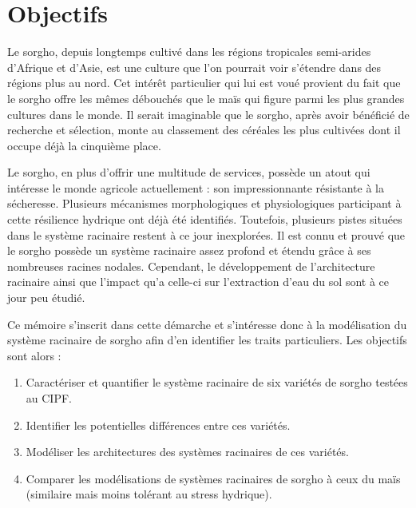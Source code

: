 \section{Objectifs}

Le sorgho, depuis longtemps cultivé dans les régions tropicales semi-arides d'Afrique et d'Asie, est une culture que l'on pourrait voir s'étendre dans des régions plus au nord.
Cet intérêt particulier qui lui est voué provient du fait que le sorgho offre les mêmes débouchés que le maïs qui figure parmi les plus grandes cultures dans le monde.
Il serait imaginable que le sorgho, après avoir bénéficié de recherche et sélection, monte au classement des céréales les plus cultivées dont il occupe déjà la cinquième place.
\newline

Le sorgho, en plus d'offrir une multitude de services, possède un atout qui intéresse le monde agricole actuellement : son impressionnante résistante à la sécheresse.
Plusieurs mécanismes morphologiques et physiologiques participant à cette résilience hydrique ont déjà été identifiés.
Toutefois, plusieurs pistes situées dans le système racinaire restent à ce jour inexplorées.
Il est connu et prouvé que le sorgho possède un système racinaire assez profond et étendu grâce à ses nombreuses racines nodales.
Cependant, le développement de l'architecture racinaire ainsi que l'impact qu'a celle-ci sur l'extraction d'eau du sol sont à ce jour peu étudié.
\newline

Ce mémoire s'inscrit dans cette démarche et s'intéresse donc à la modélisation du système racinaire de sorgho afin d'en identifier les traits particuliers.
Les objectifs sont alors :
\begin{enumerate}
    \item Caractériser et quantifier le système racinaire de six variétés de sorgho testées au CIPF. 
    \item Identifier les potentielles différences entre ces variétés.
    \item Modéliser les architectures des systèmes racinaires de ces variétés.
    \item Comparer les modélisations de systèmes racinaires de sorgho à ceux du maïs (similaire mais moins tolérant au stress hydrique).
\end{enumerate}

